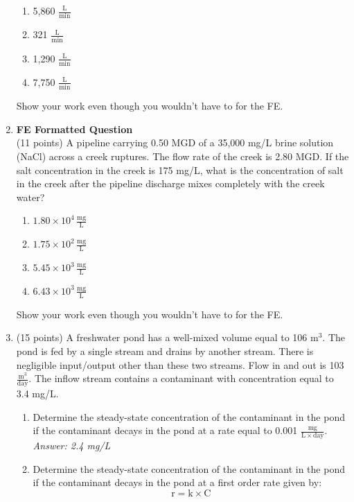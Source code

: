 \documentclass[12pt,letterpaper]{article}
\begin{document}
\begin{enumerate}
\begin{enumerate}
\item 5,860 $\mathrm{\frac{L}{min}}$
\item 321 $\mathrm{\frac{L}{min}}$
\item 1,290 $\mathrm{\frac{L}{min}}$
\item 7,750 $\mathrm{\frac{L}{min}}$
\end{enumerate}
Show your work even though you wouldn't have to for the FE.


\item \textbf{FE Formatted Question}\\
(11 points) A pipeline carrying 0.50 MGD of a 35,000 mg/L brine solution (NaCl) across a creek ruptures.  The flow rate of the creek is 2.80 MGD.  If the salt concentration in the creek is 175 mg/L, what is the concentration of salt in the creek after the pipeline discharge mixes completely with the creek water?

\begin{enumerate}
\item $\mathrm{1.80\times 10^4\, \frac{mg}{L}}$
\item $\mathrm{1.75\times 10^2\, \frac{mg}{L}}$
\item $\mathrm{5.45\times 10^3\, \frac{mg}{L}}$
\item $\mathrm{6.43\times 10^3\, \frac{mg}{L}}$
\end{enumerate}
Show your work even though you wouldn't have to for the FE.


\item (15 points) A freshwater pond has a well-mixed volume equal to 106 $\mathrm{m^3}$.   The pond is fed by a single stream and drains by another stream.  There is negligible input/output other than these two streams.  Flow in and out is 103 $\mathrm{\frac{m^3}{day}}$.  The inflow stream contains a contaminant with concentration equal to 3.4 mg/L. 

\begin{enumerate}
\item Determine the steady-state concentration of the contaminant in the pond if the contaminant decays in the pond at a rate equal to 0.001 $\mathrm{\frac{mg}{L\times day}}$.\\
\emph{Answer: 2.4 mg/L}
 
\item Determine the steady-state concentration of the contaminant in the pond if the contaminant decays in the pond at a first order rate given by:
\begin{equation*}
\mathrm{r = k\times C}
\end{equation*} 


\end{enumerate}
\end{enumerate}
\end{document}
